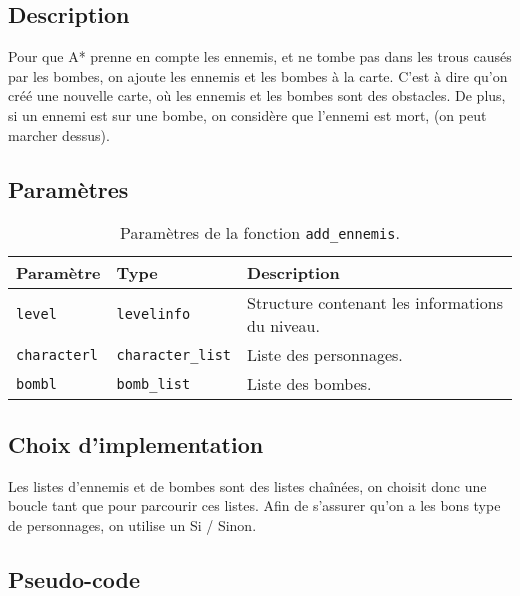 \subsection{Description}

Pour que A* prenne en compte les ennemis, et ne tombe pas dans les trous causés par les bombes, on ajoute les ennemis et les bombes à la carte.
C'est à dire qu'on créé une nouvelle carte, où les ennemis et les bombes sont des obstacles.
De plus, si un ennemi est sur une bombe, on considère que l'ennemi est mort, (on peut marcher dessus).

\subsection{Paramètres}

\begin{table}[!htpb]
    \begin{tabularx}{\textwidth}{lXX}
        \toprule
        \textbf{Paramètre} & \textbf{Type} & \textbf{Description} \\
        \midrule
        \texttt{level} & \texttt{levelinfo} & Structure contenant les informations du niveau. \\
        \texttt{characterl} & \texttt{character\_list} & Liste des personnages. \\
        \texttt{bombl} & \texttt{bomb\_list} & Liste des bombes. \\
        \bottomrule
    \end{tabularx}
    \caption{Paramètres de la fonction \texttt{add\_ennemis}.}
    \label{tab:parameters-add_ennemis}
\end{table}

\subsection{Choix d'implementation}

Les listes d'ennemis et de bombes sont des listes chaînées, on choisit donc une boucle tant que pour parcourir ces listes.
Afin de s'assurer qu'on a les bons type de personnages, on utilise un Si / Sinon.

\subsection{Pseudo-code}

